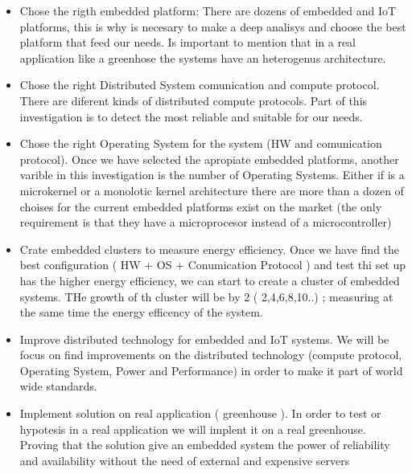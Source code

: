 \begin{itemize}
\item Chose the rigth embedded platform: There are dozens of embedded and IoT
    platforms, this is why is necesary to make a deep analisys and choose the
    best platform that feed our needs. Is important to mention that in a real
    application like a greenhose the systems have an heterogenus architecture.
\item Chose the right Distributed System comunication and compute protocol.
    There are diferent kinds of distributed compute protocols. Part of this
    investigation is to detect the most reliable and suitable for our needs.
\item Chose the right Operating System for the system (HW and comunication
    protocol). Once we have selected the apropiate embedded platforms, another 
    varible in this investigation is the number of Operating
    Systems. Either if is a microkernel or a monolotic kernel architecture
    there are more than a dozen of choises for the current embedded platforms
    exist on the market (the only requirement is that they have a microprocesor
    instead of a microcontroller)
\item Crate embedded clusters to measure energy efficiency. Once we have find
    the best configuration ( HW + OS + Conumication Protocol ) and test thi set
    up has the higher energy efficiency, we can start to create a cluster of
    embedded systems. THe growth of th cluster will be by 2 ( 2,4,6,8,10..) ;
    measuring at the same time the energy efficency of the system.
\item Improve distributed technology for embedded and IoT systems. We will be
    focus on find improvements on the distributed technology (compute
    protocol, Operating System, Power and Performance) in order to make it part
    of world wide standards.
\item Implement solution on real application ( greenhouse ). In order to test
    or hypotesis in a real application we will implent it on a real
    greenhouse. Proving that the solution give an embedded system the power of
    reliability and availability without the need of external and expensive servers 
\end{itemize}


\clearpage
